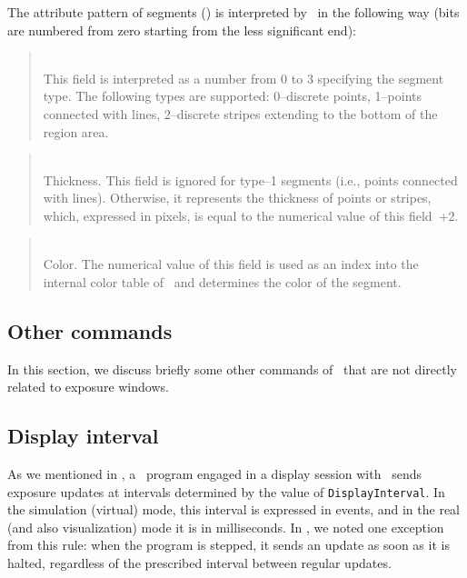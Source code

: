 The attribute pattern of segments () is interpreted by
\dsd\ in the following way (bits are numbered from zero starting from the
less significant end):


\begin{quote}
\noindent\hspace{-0.35in}{\bf Bits 0--1}\\ \hspace{0in}
This field is interpreted as a number from 0 to 3 specifying the segment
type.
The following types are supported:
0--discrete points, 1--points connected with lines, 2--discrete stripes
extending to the bottom of the region area.
\end{quote}

\begin{quote}
\noindent\hspace{-0.35in}{\bf Bits 2--5}\\ \hspace{0in}
Thickness.
This field is ignored for type--1 segments (i.e., points connected with
lines).
Otherwise, it represents the thickness of points or stripes,
which, expressed in pixels, is equal to the numerical value of this field~+2.
\end{quote}

\begin{quote}
\noindent\hspace{-0.35in}{\bf Bits 6--13}\\ \hspace{0in}
Color.
The numerical value of this field is used as an index into the internal
color table of \dsd\ and determines the color of the segment.
\end{quote}

\subsection{Other commands}

In this section, we discuss briefly some other commands of \dsd\ that are
not directly related to exposure windows.

\subsection{Display interval}

As we mentioned in , a \smurph\ program engaged in a display
session with \dsd\ sends exposure updates at intervals determined by the
value of {\tt DisplayInterval}.
In the simulation (virtual) mode, this interval is expressed in events, and
in the real (and also visualization)
mode it is in milliseconds.
In , we noted one exception from this rule: when the program
is stepped, it sends an update as soon as it is halted, regardless of the
prescribed interval between regular updates.

